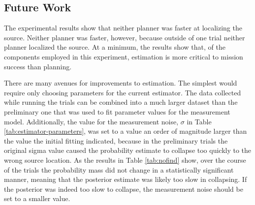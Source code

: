\documentclass[submit, 12pt]{aiaa-pretty-modified}
\begin{document}


\subsection{Future Work}
The experimental results show that neither planner was faster at
localizing the source. Neither planner was faster, however, because outside of
one trial neither planner localized the source.  At a minimum, the results show
that, of the components employed in this experiment, estimation is more critical
to mission success than planning. 

There are many avenues for improvements to estimation. The simplest would
require only choosing parameters for the current estimator. The data collected
while running the trials can be combined into a much larger dataset than the
preliminary one that was used to fit parameter values for the measurement model.
Additionally, the value for the measurement noise, $\sigma$ in Table
\ref{tab:estimator-parameters}, was set to a value an order of magnitude larger
than the value the initial fitting indicated, because in the preliminary trials
the original sigma value caused the probability estimate to collapse too quickly
to the wrong source location. As the results in Table \ref{tab:nofind} show,
over the course of the trials the probability mass did not change in a
statistically significant manner, meaning that the posterior estimate was likely
too slow in collapsing.  If the posterior was indeed too slow to collapse, the
measurement noise should be set to a smaller value. 
\end{document}
